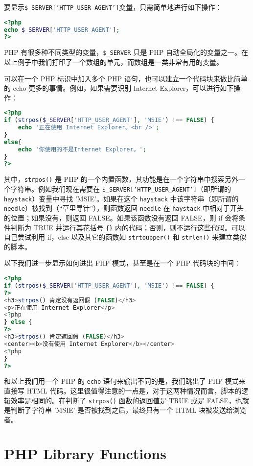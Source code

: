 要显示\texttt{\$\_SERVER['HTTP\_USER\_AGENT']}变量，只需简单地进行如下操作：

\begin{lstlisting}[language=PHP]
<?php 
echo $_SERVER['HTTP_USER_AGENT']; 
?>
\end{lstlisting}

PHP 有很多种不同类型的变量，\texttt{\$\_SERVER} 只是 PHP 自动全局化的变量之一。在以上例子中我们打印了一个数组的单元，而数组是一类非常有用的变量。

可以在一个 PHP 标识中加入多个 PHP 语句，也可以建立一个代码块来做比简单的 echo 更多的事情。例如，如果需要识别 Internet Explorer，可以进行如下操作：


\begin{lstlisting}[language=PHP]
<?php
if (strpos($_SERVER['HTTP_USER_AGENT'], 'MSIE') !== FALSE) {
    echo '正在使用 Internet Explorer。<br />';
}
else{
    echo '你使用的不是Internet Explorer。';
}
?>
\end{lstlisting}

其中，\texttt{strpos()} 是 PHP 的一个内置函数，其功能是在一个字符串中搜索另外一个字符串。例如我们现在需要在 \texttt{\$\_SERVER['HTTP\_USER\_AGENT']}（即所谓的 \texttt{haystack}）变量中寻找 'MSIE'。如果在这个 \texttt{haystack} 中该字符串（即所谓的 \texttt{needle}）被找到（“草里寻针”），则函数返回 \texttt{needle} 在 \texttt{haystack} 中相对于开头的位置；如果没有，则返回 FALSE。如果该函数没有返回 FALSE，则 if 会将条件判断为 TRUE 并运行其花括号 \texttt{\{\}} 内的代码；否则，则不运行这些代码。可以自己尝试利用 if，else 以及其它的函数如 \texttt{strtoupper()} 和 \texttt{strlen()} 来建立类似的脚本。


以下我们进一步显示如何进出 PHP 模式，甚至是在一个 PHP 代码块的中间：


\begin{lstlisting}[language=PHP]
<?php
if (strpos($_SERVER['HTTP_USER_AGENT'], 'MSIE') !== FALSE) {
?>
<h3>strpos() 肯定没有返回假 (FALSE)</h3>
<p>正在使用 Internet Explorer</p>
<?php
} else {
?>
<h3>strpos() 肯定返回假 (FALSE)</h3>
<center><b>没有使用 Internet Explorer</b></center>
<?php
}
?>
\end{lstlisting}

和以上我们用一个 PHP 的 \texttt{echo} 语句来输出不同的是，我们跳出了 PHP 模式来直接写 HTML 代码。这里很值得注意的一点是，对于这两种情况而言，脚本的逻辑效率是相同的。在判断了 \texttt{strpos()} 函数的返回值是 TRUE 或是 FALSE，也就是判断了字符串 'MSIE' 是否被找到之后，最终只有一个 HTML 块被发送给浏览者。


\chapter{PHP Library Functions}




